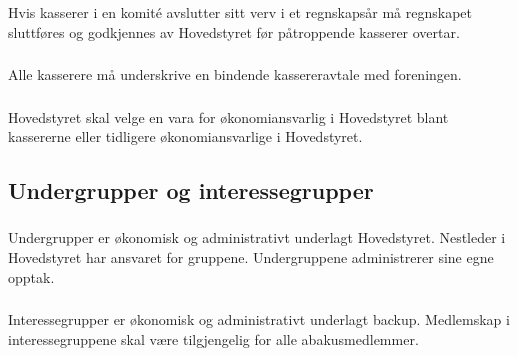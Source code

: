 \subsubsection{}
Hvis kasserer i en komité avslutter sitt verv i et regnskapsår må regnskapet
sluttføres og godkjennes av Hovedstyret før påtroppende kasserer overtar.

\subsubsection{}
Alle kasserere må underskrive en bindende kassereravtale med foreningen.

\subsubsection{}
Hovedstyret skal velge en vara for økonomiansvarlig i Hovedstyret blant kassererne eller tidligere økonomiansvarlige i Hovedstyret.

\subsection{Undergrupper og interessegrupper}

\subsubsection{}
Undergrupper er økonomisk og administrativt underlagt Hovedstyret. Nestleder i
Hovedstyret har ansvaret for gruppene. Undergruppene administrerer sine egne
opptak.

\subsubsection{}
Interessegrupper er økonomisk og administrativt underlagt backup. Medlemskap i
interessegruppene skal være tilgjengelig for alle abakusmedlemmer.
